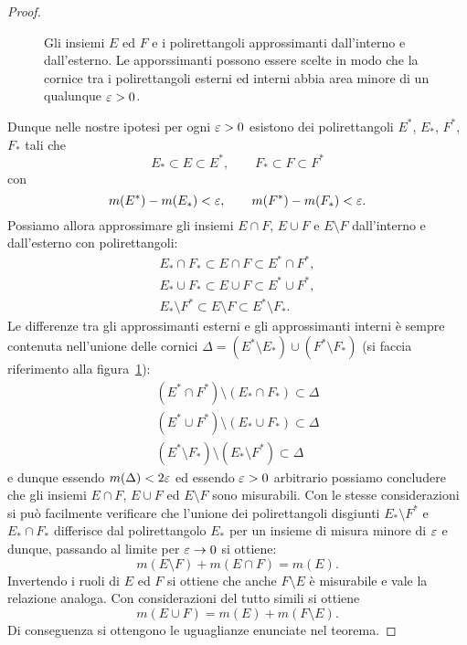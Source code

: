 \begin{proof}
\begin{figure}
  \centering
  \caption{Gli insiemi $E$ ed $F$ e i polirettangoli approssimanti dall'interno e dall'esterno. Le apporssimanti possono essere scelte in modo che la cornice tra i polirettangoli esterni ed interni abbia area minore di un qualunque $\varepsilon>0$.}
  \label{fig:PeanoJordan}
\end{figure}
Dunque nelle nostre ipotesi per ogni
$\varepsilon>0$ esistono dei polirettangoli $E^*$, $E_*$, $F^*$, $F_*$
tali che
\[
   E_* \subset E \subset E^*, \qquad
   F_* \subset F \subset F^*
\]
con
\[
  m(E^*)-m(E_*) < \varepsilon,\qquad
  m(F^*)-m(F_*) < \varepsilon.
\]
Possiamo allora approssimare gli insiemi $E\cap F$, $E\cup F$ e $E\setminus F$ dall'interno e dall'esterno con polirettangoli:
\begin{gather*}
  E_*\cap F_* \subset E\cap F \subset E^*\cap F^*, \\
  E_*\cup F_* \subset E\cup F \subset E^* \cup F^*, \\
  E_* \setminus F^* \subset E\setminus F \subset E^*\setminus F_*.
\end{gather*}
Le differenze tra gli approssimanti esterni e gli approssimanti
interni è sempre contenuta nell'unione
delle cornici $\Delta = (E^*\setminus E_*)\cup (F^*\setminus F_*)$
(si faccia riferimento alla figura~\ref{fig:PeanoJordan}):
\begin{align*}
  (E^*\cap F^*) \setminus (E_* \cap F_*) \subset \Delta \\
  (E^*\cup F^*) \setminus (E_*\cup F_*) \subset \Delta \\
  (E^*\setminus F_*) \setminus (E_* \setminus F^*) \subset \Delta
\end{align*}
e dunque essendo $m(\Delta)<2\varepsilon$ ed essendo $\varepsilon>0$ arbitrario
possiamo concludere che gli insiemi $E\cap F$, $E\cup F$ ed $E\setminus F$ sono misurabili.
Con le stesse considerazioni si può facilmente verificare
che l'unione dei polirettangoli disgiunti
$E_*\setminus F^*$ e $E_*\cap F_*$ differisce dal polirettangolo
$E_*$ per un insieme di misura minore di $\varepsilon$ e dunque, passando al limite per $\varepsilon\to 0$ si ottiene:
\[
  m(E\setminus F) + m(E\cap F) = m(E).
\]
Invertendo i ruoli di $E$ ed $F$ si ottiene che anche $F\setminus E$
è misurabile e vale la relazione analoga. Con considerazioni del
tutto simili si ottiene
\[
  m(E\cup F) = m(E) + m(F\setminus E).
\]
Di conseguenza si ottengono le uguaglianze enunciate nel teorema.
\end{proof}

